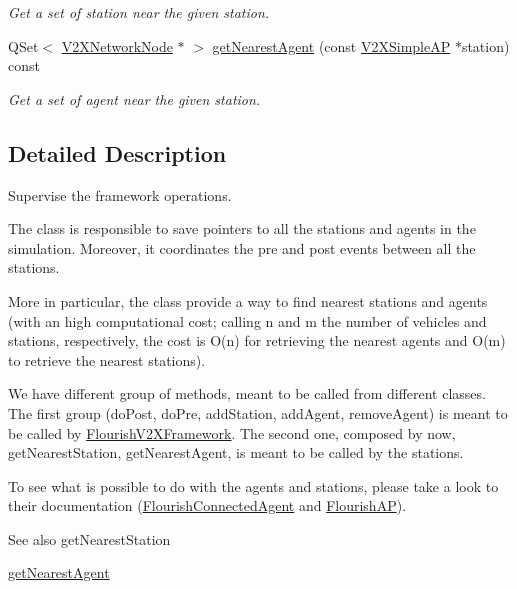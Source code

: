 \begin{DoxyCompactItemize}
\begin{DoxyCompactList}\small\item\em Get a set of station near the given station. \end{DoxyCompactList}\item 
Q\+Set$<$ \hyperlink{classV2XNetworkNode}{V2\+X\+Network\+Node} $\ast$ $>$ \hyperlink{classFlourishBroker_a19d8cf9d985f5bcac58abb0e5f01860e}{get\+Nearest\+Agent} (const \hyperlink{classV2XSimpleAP}{V2\+X\+Simple\+AP} $\ast$station) const 
\begin{DoxyCompactList}\small\item\em Get a set of agent near the given station. \end{DoxyCompactList}\end{DoxyCompactItemize}


\subsection{Detailed Description}
Supervise the framework operations. 

The class is responsible to save pointers to all the stations and agents in the simulation. Moreover, it coordinates the pre and post events between all the stations.

More in particular, the class provide a way to find nearest stations and agents (with an high computational cost; calling n and m the number of vehicles and stations, respectively, the cost is O(n) for retrieving the nearest agents and O(m) to retrieve the nearest stations).

We have different group of methods, meant to be called from different classes. The first group (do\+Post, do\+Pre, add\+Station, add\+Agent, remove\+Agent) is meant to be called by \hyperlink{classFlourishV2XFramework}{Flourish\+V2\+X\+Framework}. The second one, composed by now, get\+Nearest\+Station, get\+Nearest\+Agent, is meant to be called by the stations.

To see what is possible to do with the agents and stations, please take a look to their documentation (\hyperlink{classFlourishConnectedAgent}{Flourish\+Connected\+Agent} and \hyperlink{classFlourishAP}{Flourish\+AP}).

\begin{DoxySeeAlso}{See also}
get\+Nearest\+Station 

\hyperlink{classFlourishBroker_a19d8cf9d985f5bcac58abb0e5f01860e}{get\+Nearest\+Agent} 
\end{DoxySeeAlso}


